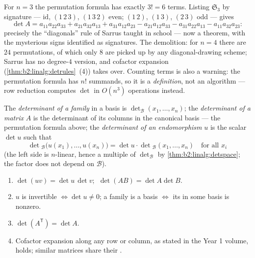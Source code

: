 \begin{example}\label{ex:b2:linalg:sarrus}
For $n = 3$ the permutation formula has exactly $3! = 6$ terms.
Listing $\mathfrak{S}_3$ by signature ---
$\mathrm{id}$, $(1\,2\,3)$, $(1\,3\,2)$ even;
$(1\,2)$, $(1\,3)$, $(2\,3)$ odd --- gives
\[
\det A = a_{11}a_{22}a_{33} + a_{21}a_{32}a_{13} +
a_{31}a_{12}a_{23}
- a_{21}a_{12}a_{33} - a_{31}a_{22}a_{13} -
a_{11}a_{32}a_{23} :
\]
precisely the ``diagonals'' rule of Sarrus taught in school ---
now a theorem, with the mysterious signs identified as
signatures. The demolition: for $n = 4$ there are $24$
permutations, of which only $8$ are picked up by any
diagonal-drawing scheme; Sarrus has no degree-$4$ version, and
cofactor expansion (\cref{thm:b2:linalg:detrules}~(4)) takes
over. Counting terms is also a warning: the permutation formula
has $n!$ summands, so it is a \emph{definition}, not an
algorithm --- row reduction computes $\det$ in $O(n^3)$
operations instead.
\end{example}

\begin{definition}[Determinants]\label{def:b2:linalg:det}
The \emph{determinant of a family} in a basis is
$\det_{\mathcal{B}}(x_1, \dots, x_n)$; the \emph{determinant of a
matrix} $A$ is the determinant of its columns in the canonical basis
--- the permutation formula above; the \emph{determinant of an
endomorphism} $u$ is the scalar $\det u$ such that
\[
\det{}_{\mathcal{B}}\bigl(u(x_1), \dots, u(x_n)\bigr)
= \det u \cdot \det{}_{\mathcal{B}}(x_1, \dots, x_n)
\quad \text{for all } x_i
\]
(the left side is  $n$-linear, hence a multiple of
$\det_\mathcal{B}$ by \cref{thm:b2:linalg:detspace}; the factor does
not depend on $\mathcal{B}$).
\end{definition}

\begin{theorem}\label{thm:b2:linalg:detrules}
\begin{enumerate}
  \item $\det(uv) = \det u\,\det v$; $\;\det(AB) = \det A \det B$.
  \item $u$ is invertible $\iff \det u \neq 0$; a family is a basis
        $\iff$ its  in some basis is nonzero.
  \item $\det(A^{\mathsf T}) = \det A$.
  \item Cofactor expansion along any row or column, as stated in the
        Year 1 volume, holds; similar matrices share their
        .
\end{enumerate}
\end{theorem}

